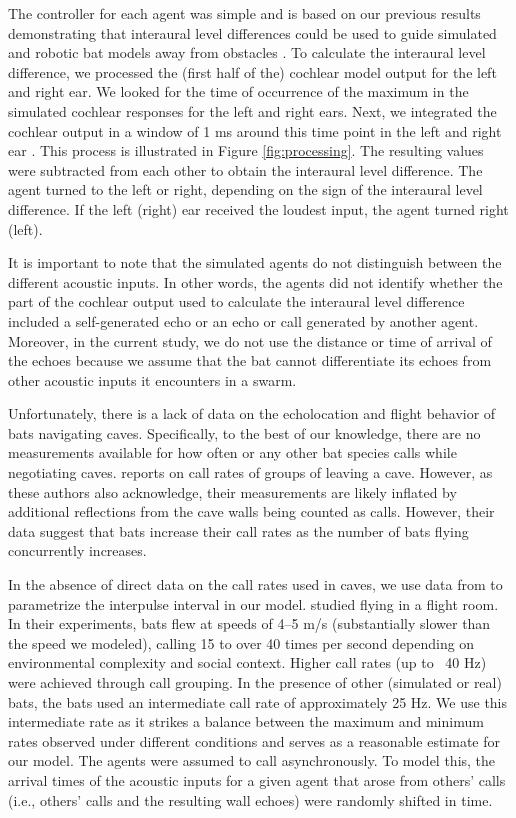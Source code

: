 \documentclass[a4paper, 11pt]{article}
\begin{document}
The controller for each agent was simple and is based on our previous results demonstrating that interaural level differences could be used to guide simulated and robotic bat models away from obstacles \citep{Vanderelst2015a,Mansour2019}. To calculate the interaural level difference, we processed the (first half of the) cochlear model output for the left and right ear. We looked for the time of occurrence of the maximum in the simulated cochlear responses for the left and right ears. Next, we integrated the cochlear output in a window of 1 ms around this time point in the left and right ear \citep[i.e., akin to the approach used in][]{Vanderelst2015a,Mansour2019}. This process is illustrated in Figure \ref{fig:processing}. The resulting values were subtracted from each other to obtain the interaural level difference. The agent turned to the left or right, depending on the sign of the interaural level difference. If the left (right) ear received the loudest input, the agent turned right (left). 

It is important to note that the simulated agents do not distinguish between the different acoustic inputs. In other words, the agents did not identify whether the part of the cochlear output used to calculate the interaural level difference included a self-generated echo or an echo or call generated by another agent. Moreover, in the current study, we do not use the distance or time of arrival of the echoes because we assume that the bat cannot differentiate its echoes from other acoustic inputs it encounters in a swarm.

Unfortunately, there is a lack of data on the echolocation and flight behavior of bats navigating caves. Specifically, to the best of our knowledge, there are no measurements available for how often  or any other bat species calls while negotiating caves. \citet{Lin2016} reports on call rates of groups of  leaving a cave. However, as these authors also acknowledge, their measurements are likely inflated by additional reflections from the cave walls being counted as calls. However, their data suggest that bats increase their call rates as the number of bats flying concurrently increases. 

In the absence of direct data on the call rates used in caves, we use data from \citet{Adams2017} to parametrize the interpulse interval in our model. \citet{Adams2017} studied  flying in a flight room. In their experiments, bats flew at speeds of 4–5 m/s (substantially slower than the speed we modeled), calling 15 to over 40 times per second depending on environmental complexity and social context. Higher call rates (up to ~40 Hz) were achieved through call grouping. In the presence of other (simulated or real) bats, the bats used an intermediate call rate of approximately 25 Hz. We use this intermediate rate as it strikes a balance between the maximum and minimum rates observed under different conditions and serves as a reasonable estimate for our model. The agents were assumed to call asynchronously. To model this, the arrival times of the acoustic inputs for a given agent that arose from others' calls (i.e., others' calls and the resulting wall echoes) were randomly shifted in time. 
\end{document}

